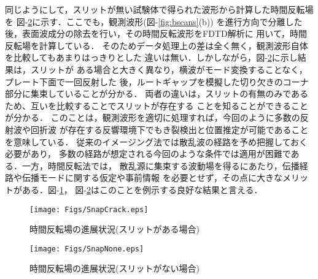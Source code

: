 同じようにして，スリットが無い試験体で得られた波形から計算した時間反転場を
{\rm 図}-\ref{fig:snap_none}に示す．ここでも，観測波形({\rm 図}-\ref{fig:bscans}(b))
を進行方向で分離した後，表面波成分の除去を行い，その時間反転波形をFDTD解析に
用いて，時間反転場を計算している．
そのためデータ処理上の差は全く無く，観測波形自体を比較してもあまりはっきりとした
違いは無い．しかしながら，{\rm 図}-\ref{fig:snap_none}に示し結果は，スリットが
ある場合と大きく異なり，横波がモード変換することなく，プレート下面で一回反射した
後，ルートギャップを模擬した切り欠きのコーナ部分に集束していることが分かる．
両者の違いは，スリットの有無のみであるため、互いを比較することでスリットが存在する
ことを知ることができることが分かる．
このことは，観測波形を適切に処理すれば，今回のように多数の反射波や回折波
が存在する反響環境下でもき裂検出と位置推定が可能であることを意味している．
従来のイメージング法では散乱波の経路を予め把握しておく必要があり，
多数の経路が想定される今回のような条件では適用が困難である．一方，時間反転法では，
散乱源に集束する波動場を得るにあたり，伝播経路や伝播モードに関する仮定や事前情報
を必要とせず，その点に大きなメリットがある．{\rm 図}-\ref{fig:snap_crack}，
{\rm 図}-\ref{fig:snap_none}はこのことを例示する良好な結果と言える．
\begin{figure}[htb]
\centering
	\texttt{[image: Figs/SnapCrack.eps]}
	\caption{時間反転場の進展状況(スリットがある場合)}
	\label{fig:snap_crack}
\end{figure}
\begin{figure}[htb]
\centering
	\texttt{[image: Figs/SnapNone.eps]}
	\caption{時間反転場の進展状況(スリットがない場合)}
	\label{fig:snap_none}
\end{figure}
